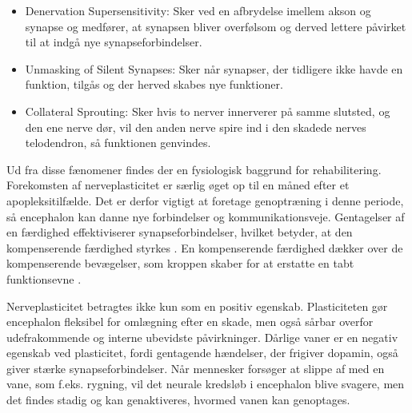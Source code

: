 \begin{itemize}
	\item Denervation Supersensitivity: Sker ved en afbrydelse imellem akson og synapse og medfører, at synapsen bliver overfølsom og derved lettere påvirket til at indgå nye synapseforbindelser.
	\item Unmasking of Silent Synapses: Sker når synapser, der tidligere ikke havde en funktion, tilgås og der herved skabes nye funktioner.
	\item Collateral Sprouting: Sker hvis to nerver innerverer på samme slutsted, og den ene nerve dør, vil den anden nerve spire ind i den skadede nerves telodendron, så funktionen genvindes.
\end{itemize}

\noindent Ud fra disse fænomener findes der en fysiologisk baggrund for rehabilitering. Forekomsten af nerveplasticitet er særlig øget op til en måned efter et apopleksitilfælde. Det er derfor vigtigt at foretage genoptræning i denne periode, så encephalon kan danne nye forbindelser og kommunikationsveje. \cite{Rugnett2015} Gentagelser af en færdighed effektiviserer synapseforbindelser, hvilket betyder, at den kompenserende færdighed styrkes \cite{Stanfield2014}. En kompenserende færdighed dækker over de kompenserende bevægelser, som kroppen skaber for at erstatte en tabt funktionsevne \cite{Takeuchi2012,Leea2009}.

Nerveplasticitet betragtes ikke kun som en positiv egenskab. Plasticiteten gør encephalon fleksibel for omlægning efter en skade, men også sårbar overfor udefrakommende og interne ubevidste påvirkninger. Dårlige vaner er en negativ egenskab ved plasticitet, fordi gentagende hændelser, der frigiver dopamin, også giver stærke synapseforbindelser. Når mennesker forsøger at slippe af med en vane, som f.eks. rygning, vil det neurale kredsløb i encephalon blive svagere, men det findes stadig og kan genaktiveres, hvormed vanen kan genoptages. \cite{Hampton2015}



